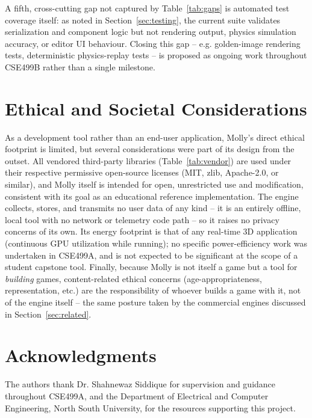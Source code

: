 \documentclass[conference]{IEEEtran}
\begin{document}
A fifth, cross-cutting gap not captured by Table~\ref{tab:gaps} is
automated test coverage itself: as noted in Section~\ref{sec:testing},
the current suite validates serialization and component logic but not
rendering output, physics simulation accuracy, or editor UI behaviour.
Closing this gap -- e.g. golden-image rendering tests, deterministic
physics-replay tests -- is proposed as ongoing work throughout CSE499B
rather than a single milestone.

\section{Ethical and Societal Considerations}

As a development tool rather than an end-user application, Molly's
direct ethical footprint is limited, but several considerations were
part of its design from the outset. All vendored third-party libraries
(Table~\ref{tab:vendor}) are used under their respective permissive
open-source licenses (MIT, zlib, Apache-2.0, or similar), and Molly
itself is intended for open, unrestricted use and modification,
consistent with its goal as an educational reference implementation. The
engine collects, stores, and transmits no user data of any kind -- it is
an entirely offline, local tool with no network or telemetry code path
-- so it raises no privacy concerns of its own. Its energy footprint is
that of any real-time 3D application (continuous GPU utilization while
running); no specific power-efficiency work was undertaken in CSE499A,
and is not expected to be significant at the scope of a student capstone
tool. Finally, because Molly is not itself a game but a tool for
\emph{building} games, content-related ethical concerns (age-appropriateness,
representation, etc.) are the responsibility of whoever builds a game
with it, not of the engine itself -- the same posture taken by the
commercial engines discussed in Section~\ref{sec:related}.

\section*{Acknowledgments}

The authors thank Dr. Shahnewaz Siddique for supervision and guidance
throughout CSE499A, and the Department of Electrical and Computer
Engineering, North South University, for the resources supporting this
project.
\end{document}
